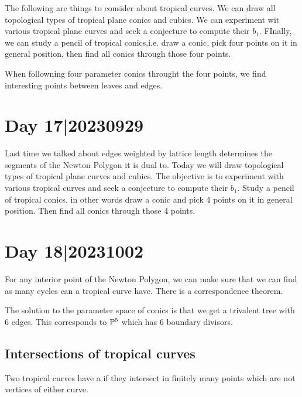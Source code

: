 \documentclass[12pt]{memoir}
\theoremstyle{definition}
\begin{document}
The following are things to consider about tropical curves. We can draw all topological types of tropical plane conics and cubics. We can experiment wit various tropical plane curves and seek a conjecture to compute their $b_1$. FInally, we can study a pencil of tropical conics,i.e. draw a conic, pick four points on it in general position, then find all conics through those four points.

When followning four parameter conics throught the four points, we find interesting points between leaves and edges.

\section{Day 17|20230929}

Last time we talked about edges weighted by lattice length determines the segments of the Newton Polygon it is dual to. Today we will draw topological types of tropical plane curves and cubics. The objective is to experiment with various tropical curves and seek a conjecture to compute their $b_1$. Study a pencil of tropical conics, in other words draw a conic and pick 4 points on it in general position. Then find all conics through those 4 points.

\section{Day 18|20231002}%




For any interior point of the Newton Polygon, we can make sure that we can find as many cycles can a tropical curve have. There is a correspondence theorem.\par 
The solution to the parameter space of conics is that we get a trivalent tree with $6$ edges. This corresponds to $\mathbb{P}^5$ which has $6$ boundary divisors.

\subsection{Intersections of tropical curves}

\begin{Def}
    Two tropical curves have a  if they intersect in finitely many points which are not vertices of either curve.
\end{Def}
\end{document}
